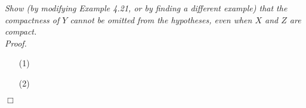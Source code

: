 \documentclass{article}
\begin{document}
\emph{Show (by modifying Example 4.21, or by finding a different example) that
the compactness of $Y$ cannot be omitted from the hypotheses,
even when $X$ and $Z$ are compact.} \\

\emph{Proof.}
\begin{enumerate}
\item[(1)]

\item[(2)]
\end{enumerate}
$\Box$\\\\



\end{document}
